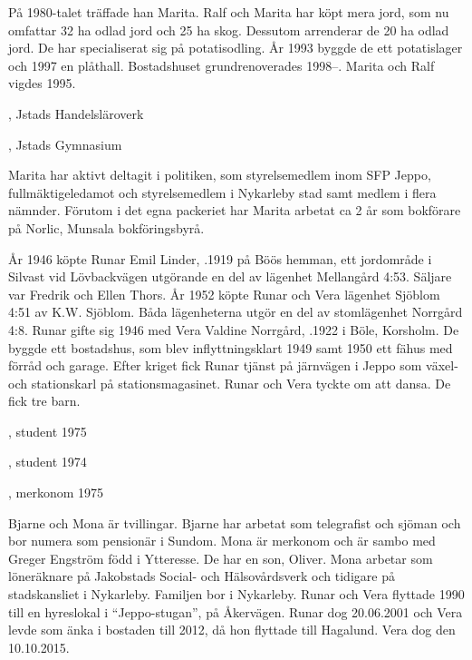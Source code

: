 På 1980-talet träffade han Marita. Ralf och Marita har köpt mera jord, som nu omfattar 32 ha odlad jord och 25 ha skog. Dessutom arrenderar de 20 ha odlad jord. De har specialiserat sig på potatisodling. År 1993 byggde de ett potatislager och 1997 en plåthall. Bostadshuset grundrenoverades 1998--. Marita och Ralf vigdes 1995.
\begin{jhchildren}
  \item {}, Jstads Handelsläroverk
  \item {}, Jstads Gymnasium
\end{jhchildren}
Marita har aktivt deltagit i politiken, som styrelsemedlem inom SFP Jeppo, fullmäktigeledamot och styrelsemedlem i Nykarleby stad samt medlem i flera nämnder. Förutom i det egna packeriet har Marita arbetat ca 2 år som bokförare på Norlic, Munsala bokföringsbyrå.


År 1946 köpte Runar Emil Linder, .1919 på Böös hemman, ett jordområde i Silvast vid Lövbackvägen utgörande en del av lägenhet Mellangård	4:53. Säljare var Fredrik och Ellen Thors. År 1952 köpte Runar och Vera lägenhet Sjöblom 4:51 av K.W. Sjöblom. Båda lägenheterna utgör en del av stomlägenhet Norrgård 4:8. Runar gifte sig 1946 med Vera Valdine Norrgård, .1922 i Böle, Korsholm. De byggde ett bostadshus, som blev inflyttningsklart 1949 samt 1950 ett 	fähus med förråd och garage. Efter kriget fick Runar tjänst på järnvägen i Jeppo som växel- och stationskarl på stationsmagasinet. Runar och Vera tyckte om att dansa. De fick tre barn.
\begin{jhchildren}
  \item {}, student 1975
  \item {}, student 1974
  \item {}, merkonom 1975
\end{jhchildren}
Bjarne och Mona är tvillingar. Bjarne har arbetat som telegrafist och sjöman och bor numera som pensionär i Sundom. Mona är merkonom och är sambo med Greger Engström född i Ytteresse. De har en son, Oliver. Mona arbetar som löneräknare på Jakobstads Social- och Hälsovårdsverk och tidigare på stadskansliet i Nykarleby. Familjen bor i Nykarleby.
Runar och Vera flyttade 1990 till en hyreslokal i ``Jeppo-stugan'', på 	Åkervägen. Runar dog 20.06.2001 och Vera levde som änka i bostaden till 2012, då hon flyttade till Hagalund. Vera dog den 10.10.2015.
